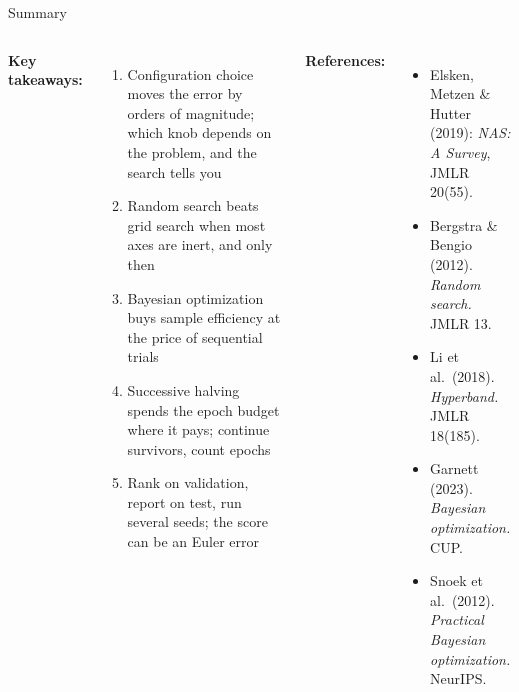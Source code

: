 \documentclass[aspectratio=169,11pt]{beamer}
\newcommand{\emphc}[1]{\textcolor{harvardcrimson}{#1}}
\begin{document}
\begin{frame}{Summary}
\begin{columns}[T]
\textbf{Key takeaways:}
\begin{enumerate}
    \item Configuration choice moves the error by orders of magnitude; which knob depends on the problem, and the search tells you
    \item Random search beats grid search when most axes are inert, and only then
    \item Bayesian optimization buys sample efficiency at the price of sequential trials
    \item Successive halving spends the epoch budget where it pays; continue survivors, count epochs
    \item Rank on validation, report on test, run several seeds; the score can be an Euler error
\end{enumerate}

\textbf{References:}
{\scriptsize
\begin{itemize}\itemsep0pt
    \item \emphc{Elsken, Metzen \& Hutter (2019)}: \emph{NAS: A Survey}, JMLR 20(55).
    \item Bergstra \& Bengio (2012). \emph{Random search.} JMLR 13.
    \item Li et al.\ (2018). \emph{Hyperband.} JMLR 18(185).
    \item Garnett (2023). \emph{Bayesian optimization.} CUP.
    \item Snoek et al.\ (2012). \emph{Practical Bayesian optimization.} NeurIPS.
\end{itemize}
}
\end{columns}

\end{frame}
\end{document}
